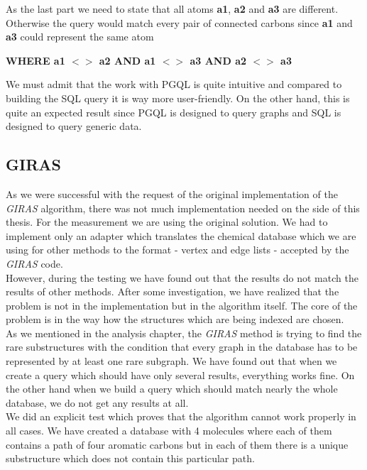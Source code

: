 {As the last part we need to state that all atoms \textbf{a1}, \textbf{a2} and \textbf{a3} are different. Otherwise the query would match every pair of connected carbons since \textbf{a1} and \textbf{a3} could represent the same atom

\begin{center}
	\textbf{WHERE a1 $<>$ a2 AND a1 $<>$ a3 AND a2 $<>$ a3}
\end{center}

We must admit that the work with PGQL is quite intuitive and compared to building the SQL query it is way more user-friendly. On the other hand, this is quite an expected result since PGQL is designed to query graphs and SQL is designed to query generic data.

\subsection{GIRAS}

As we were successful with the request of the original implementation of the \textit{GIRAS} algorithm, there was not much implementation needed on the side of this thesis. For the measurement we are using the original solution. We had to implement only an adapter which translates the chemical database which we are using for other methods to the format - vertex and edge lists - accepted by the \textit{GIRAS} code.\\

However, during the testing we have found out that the results do not match the results of other methods. After some investigation, we have realized that the problem is not in the implementation but in the algorithm itself. The core of the problem is in the way how the structures which are being indexed are chosen.\\

As we mentioned in the analysis chapter, the \textit{GIRAS} method is trying to find the rare substructures with the condition that every graph in the database has to be represented by at least one rare subgraph. We have found out that when we create a query which should have only several results, everything works fine. On the other hand when we build a query which should match nearly the whole database, we do not get any results at all.\\

We did an explicit test which proves that the algorithm cannot work properly in all cases. We have created a database with 4 molecules where each of them contains a path of four aromatic carbons but in each of them there is a unique substructure which does not contain this particular path.\\

}
